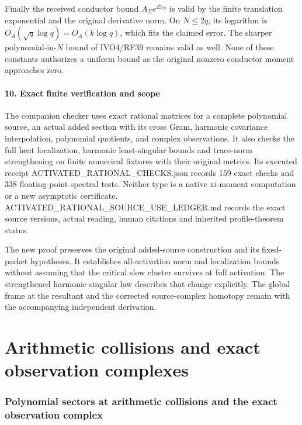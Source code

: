 \documentclass[11pt]{article}
\begin{document}
Finally the received conductor bound \(A_\Sigma e^{Zb_N}\) is valid by the finite translation exponential and the original derivative norm. On \(N\le2q\), its logarithm is \(O_A(\sqrt q\log q)=O_A(k\log q)\), which fits the claimed error. The sharper polynomial-in-\(N\) bound of IVO4/RF39 remains valid as well. None of these constants authorizes a uniform bound as the original nonzero conductor moment approaches zero.

\subsection{10. Exact finite verification and scope}\label{exact-finite-verification-and-scope}

The companion checker uses exact rational matrices for a complete polynomial source, an actual added section with its cross Gram, harmonic covariance interpolation, polynomial quotients, and complex observations. It also checks the full heat localization, harmonic least-singular bounds and trace-norm strengthening on finite numerical fixtures with their original metrics. Its executed receipt ACTIVATED\_RATIONAL\_CHECKS.json records 159 exact checks and 338 floating-point spectral tests. Neither type is a native xi-moment computation or a new asymptotic certificate. ACTIVATED\_RATIONAL\_SOURCE\_USE\_LEDGER.md records the exact source versions, actual reading, human citations and inherited profile-theorem status.

The new proof preserves the original added-source construction and its fixed-packet hypotheses. It establishes all-activation norm and localization bounds without assuming that the critical slow cluster survives at full activation. The strengthened harmonic singular law describes that change explicitly. The global frame at the resultant and the corrected source-complex homotopy remain with the accompanying independent derivation.


\clearpage\part{Arithmetic collisions and exact observation complexes}
\section{Polynomial sectors at arithmetic collisions and the exact observation complex}\label{polynomial-sectors-at-arithmetic-collisions-and-the-exact-observation-complex}
\end{document}
